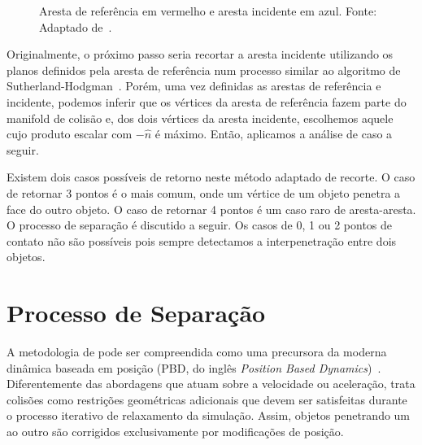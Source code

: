 \begin{figure}[htb]
    \centering
    \begin{minipage}{0.45\textwidth}
        \centering
		
		\caption{Cenário de colisão, arestas envolvidas em destaque. Fonte: Adaptado de~\cite{collision_manifolds_2017}.}
		\label{fig:collision-manifold-1}
    \end{minipage}
    \hfill
    \begin{minipage}{0.45\textwidth}
        \centering
		
		\caption{Aresta de referência em vermelho e aresta incidente em azul. Fonte: Adaptado de~\cite{collision_manifolds_2017}.}
		\label{fig:collision-manifold-2}
    \end{minipage}
\end{figure}

Originalmente, o próximo passo seria recortar a aresta incidente utilizando os planos definidos pela aresta de referência num processo similar ao algoritmo de Sutherland-Hodgman~\cite{collision_manifolds_2017}. Porém, uma vez definidas as arestas de referência e incidente, podemos inferir que os vértices da aresta de referência fazem parte do manifold de colisão e, dos dois vértices da aresta incidente, escolhemos aquele cujo produto escalar com $-\hat n$ é máximo. Então, aplicamos a análise de caso a seguir.

Existem dois casos possíveis de retorno neste método adaptado de recorte. O caso de retornar 3 pontos é o mais comum, onde um vértice de um objeto penetra a face do outro objeto. O caso de retornar 4 pontos é um caso raro de aresta-aresta. O processo de separação é discutido a seguir. Os casos de 0, 1 ou 2 pontos de contato não são possíveis pois sempre detectamos a interpenetração entre dois objetos.

\section{Processo de Separação}

A metodologia de  pode ser compreendida como uma precursora da moderna dinâmica baseada em posição (PBD, do inglês \textit{Position Based Dynamics})~\cite{muller2007position}. Diferentemente das abordagens que atuam sobre a velocidade ou aceleração,  trata colisões como restrições geométricas adicionais que devem ser satisfeitas durante o processo iterativo de relaxamento da simulação. Assim, objetos penetrando um ao outro são corrigidos exclusivamente por modificações de posição.

